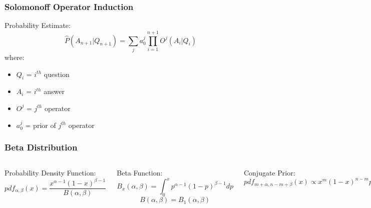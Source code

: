 \documentclass{beamer}
\begin{document}
\begin{frame}
  \frametitle{Solomonoff Operator Induction}

  Probability Estimate:
  $$
  \hat{P}(A_{n+1}|Q_{n+1}) = \sum_j a_0^j \prod_{i=1}^{n+1} O^j(A_i|Q_i)
  $$
  where:
  \begin{itemize}
  \item $Q_i$ = $i^{th}$ question
  \item $A_i$ = $i^{th}$ answer
  \item $O^j$ = $j^{th}$ operator
  \item $a^j_0$ = prior of $j^{th}$ operator
  \end{itemize}
\end{frame}

\begin{frame}
  \frametitle{Beta Distribution}

\begin{columns}

\column{2in}
  
  Probability Density Function:
  $$
    pdf_{\alpha, \beta}(x) = \frac{x^{\alpha - 1} (1-x)^{\beta - 1}}
    {B(\alpha, \beta)}
  $$

  Beta Function:
  $$
  B_x(\alpha, \beta) = \int_0^x p^{\alpha - 1}(1-p)^{\beta - 1} dp
  $$
  $$
  B(\alpha, \beta) = B_1(\alpha, \beta)
  $$

  \alert{Conjugate Prior:}
  $$
  pdf_{m+\alpha, n-m+\beta}(x)
  \propto
  x^m (1-x)^{n-m} pdf_{\alpha, \beta}(x)
  $$
  
\column{2in}
  
  \includegraphics[scale=0.2]{images/Beta_distributions.png}


\end{columns}
\end{frame}
\end{document}
